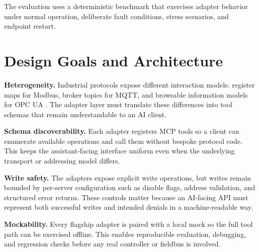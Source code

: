 \documentclass[conference]{IEEEtran}
\begin{document}
The evaluation uses a deterministic benchmark that exercises adapter behavior under normal operation, deliberate fault conditions, stress scenarios, and endpoint restart.

\section{Design Goals and Architecture}
\label{sec:architecture}

\textbf{Heterogeneity.} Industrial protocols expose different interaction models: register maps for Modbus, broker topics for MQTT, and browsable information models for OPC UA \cite{cavalieri2013opcua,mishra2020mqtt}. The adapter layer must translate these differences into tool schemas that remain understandable to an AI client.

\textbf{Schema discoverability.} Each adapter registers MCP tools so a client can enumerate available operations and call them without bespoke protocol code. This keeps the assistant-facing interface uniform even when the underlying transport or addressing model differs.

\textbf{Write safety.} The adapters expose explicit write operations, but writes remain bounded by per-server configuration such as disable flags, address validation, and structured error returns. These controls matter because an AI-facing API must represent both successful writes and intended denials in a machine-readable way.

\textbf{Mockability.} Every flagship adapter is paired with a local mock so the full tool path can be exercised offline. This enables reproducible evaluation, debugging, and regression checks before any real controller or fieldbus is involved.
\end{document}
